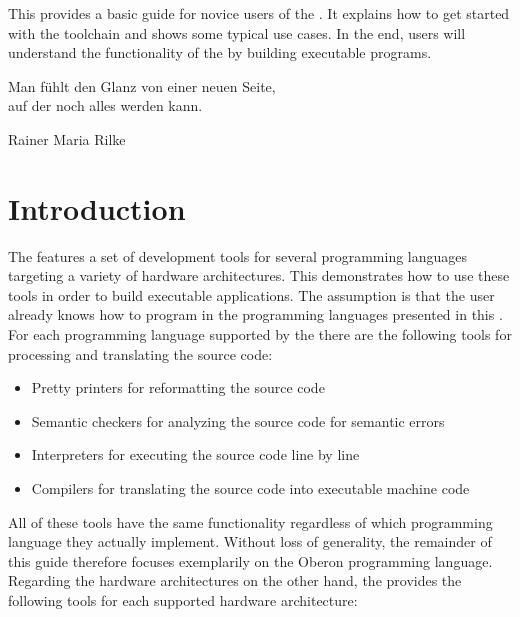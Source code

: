 




\renewcommand{\seeguide}{}

{This \documentation{} provides a basic guide for novice users of the \ecs{}.
It explains how to get started with the toolchain and shows some typical use cases.
In the end, users will understand the functionality of the \ecs{} by building executable programs.}

\epigraph{Man f\"uhlt den Glanz von einer neuen Seite, \\ auf der noch alles werden kann.}{Rainer Maria Rilke}

\section{Introduction}

The \ecs{} features a set of development tools for several programming languages targeting a variety of hardware architectures.
This \documentation{} demonstrates how to use these tools in order to build executable applications.
The assumption is that the user already knows how to program in the programming languages presented in this \documentation{}.
For each programming language supported by the \ecs{} there are the following tools for processing and translating the source code:

\begin{itemize}
\item Pretty printers for reformatting the source code
\item Semantic checkers for analyzing the source code for semantic errors
\item Interpreters for executing the source code line by line
\item Compilers for translating the source code into executable machine code
\end{itemize}

All of these tools have the same functionality regardless of which programming language they actually implement.
Without loss of generality, the remainder of this guide therefore focuses exemplarily on the Oberon programming language.
\seeoberon
Regarding the hardware architectures on the other hand, the \ecs{} provides the following tools for each supported hardware architecture:

